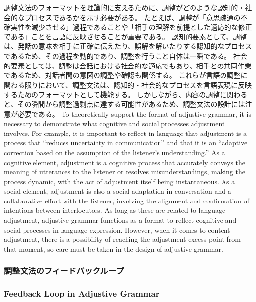 \documentclass[a4paper,xelatex,ja=standard]{bxjsarticle}
\begin{document}
\ifJPN
調整文法のフォーマットを理論的に支えるために、調整がどのような認知的・社会的なプロセスであるかを示す必要がある。
たとえば、調整が「意思疎通の不確実性を減少させる」過程であることや「相手の理解を前提とした適応的な修正である」ことを言語に反映させることが重要である。
認知的要素として、調整は、発話の意味を相手に正確に伝えたり、誤解を解いたりする認知的なプロセスであるため、その過程を動的であり、調整を行うこと自体は一瞬である。
社会的要素としては、調整は会話における社会的な適応でもあり、相手との共同作業であるため、対話者間の意図の調整や確認も関係する。
これらが言語の調整に関わる限りにおいて、調整文法は、認知的・社会的なプロセスを言語表現に反映するためのフォーマットとして機能する。
しかしながら、内容の調整に関わると、その瞬間から調整過剰点に達する可能性があるため、調整文法の設計には注意が必要である。
\else
To theoretically support the format of adjustive grammar, it is necessary to demonstrate what cognitive and social processes adjustment involves.
For example, it is important to reflect in language that adjustment is a process that ``reduces uncertainty in communication'' and that it is an ``adaptive correction based on the assumption of the listener's understanding.''
As a cognitive element, adjustment is a cognitive process that accurately conveys the meaning of utterances to the listener or resolves misunderstandings, making the process dynamic, with the act of adjustment itself being instantaneous.
As a social element, adjustment is also a social adaptation in conversation and a collaborative effort with the listener, involving the alignment and confirmation of intentions between interlocutors.
As long as these are related to language adjustment, adjustive grammar functions as a format to reflect cognitive and social processes in language expression.
However, when it comes to content adjustment, there is a possibility of reaching the adjustment excess point from that moment, so care must be taken in the design of adjustive grammar.
\fi

\ifJPN
\subsubsection{調整文法のフィードバックループ}
\else
  \subsubsection{Feedback Loop in Adjustive Grammar}
\fi
\end{document}
